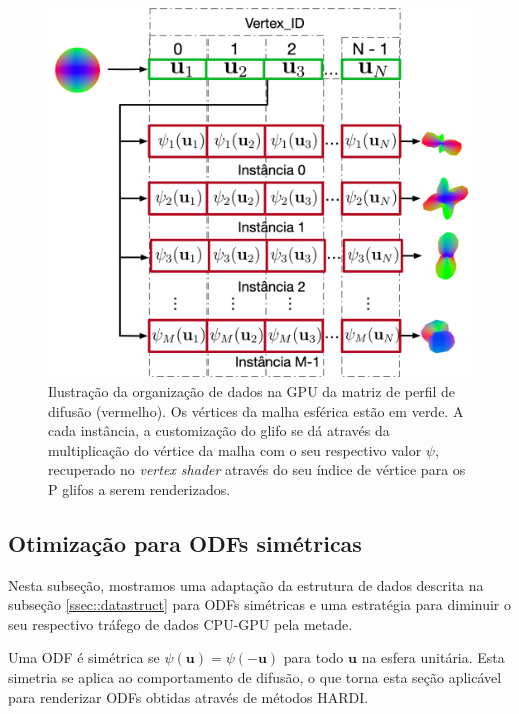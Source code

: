 \documentclass[
    12pt,                %
    oneside,            %
    a4paper,            %
    english,            %
    french,                %
    spanish,            %
    brazil                %
    ]{abntex2}
\begin{document}
\begin{figure}[h]
    \centering
    \includegraphics[width=1.0\linewidth, angle=0]{figs/Esquema_Glifo/GPU2GlifoGeneral.png}
    \caption{Ilustração da organização de dados na GPU da matriz de perfil de difusão (vermelho). Os vértices da malha esférica estão em verde. A cada instância, a customização do glifo se dá através da multiplicação do vértice da malha com o seu respectivo valor $\psi$, recuperado no \textit{vertex shader} através do seu índice de vértice para os P glifos a serem renderizados.}
    \label{fig::GPU2glifoGeneral}
   \hspace{1pt}
\end{figure}



\subsection{Otimização para ODFs simétricas}
\label{ssec::otimizacao}

Nesta subseção, mostramos uma adaptação da estrutura de dados descrita na subseção \ref{ssec::datastruct} para ODFs simétricas e uma estratégia para diminuir o seu respectivo tráfego de dados CPU-GPU pela metade.

Uma ODF é simétrica se $\psi(\mathbf{u}) = \psi (-\mathbf{u}) $ para todo $\mathbf{u}$ na esfera unitária. Esta simetria se aplica ao comportamento de difusão, o que torna esta seção aplicável para renderizar ODFs obtidas através de métodos HARDI.
\end{document}
